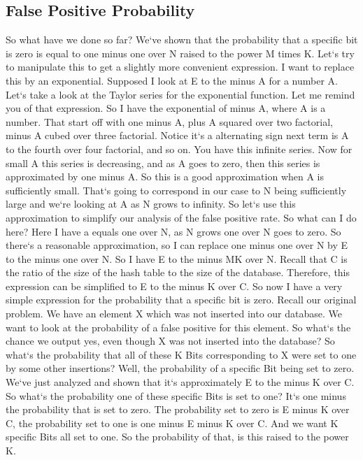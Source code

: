 \subsection{False Positive Probability}
So what have we done so far? We`ve shown that the probability that a specific bit is zero is equal to one minus one over N raised to the power M times K\@.
Let`s try to manipulate this to get a slightly more convenient expression.
I want to replace this by an exponential.
Supposed I look at E to the minus A for a number A\@.
Let`s take a look at the Taylor series for the exponential function.
Let me remind you of that expression.
So I have the exponential of minus A, where A is a number.
That start off with one minus A, plus A squared over two factorial, minus A cubed over three factorial.
Notice it`s a alternating sign next term is A to the fourth over four factorial, and so on.
You have this infinite series.
Now for small A this series is decreasing, and as A goes to zero, then this series is approximated by one minus A\@.
So this is a good approximation when A is sufficiently small.
That`s going to correspond in our case to N being sufficiently large and we`re looking at A as N grows to infinity.
So let`s use this approximation to simplify our analysis of the false positive rate.
So what can I do here? Here I have a equals one over N, as N grows one over N goes to zero.
So there`s a reasonable approximation, so I can replace one minus one over N by E to the minus one over N\@.
So I have E to the minus MK over N\@.
Recall that C is the ratio of the size of the hash table to the size of the database.
Therefore, this expression can be simplified to E to the minus K over C\@.
So now I have a very simple expression for the probability that a specific bit is zero.
Recall our original problem.
We have an element X which was not inserted into our database.
We want to look at the probability of a false positive for this element.
So what`s the chance we output yes, even though X was not inserted into the database? So what`s the probability that all of these K Bits corresponding to X were set to one by some other insertions? Well, the probability of a specific Bit being set to zero.
We`ve just analyzed and shown that it`s approximately E to the minus K over C\@.
So what`s the probability one of these specific Bits is set to one? It`s one minus the probability that is set to zero.
The probability set to zero is E minus K over C, the probability set to one is one minus E minus K over C\@.
And we want K specific Bits all set to one.
So the probability of that, is this raised to the power K\@.
